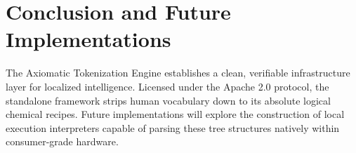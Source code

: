 \documentclass[10pt,journal,compsoc]{IEEEtran}
\begin{document}
\section{Conclusion and Future Implementations}
The Axiomatic Tokenization Engine establishes a clean, verifiable infrastructure layer for localized intelligence. Licensed under the Apache 2.0 protocol, the standalone framework strips human vocabulary down to its absolute logical chemical recipes. Future implementations will explore the construction of local execution interpreters capable of parsing these tree structures natively within consumer-grade hardware.
\end{document}
